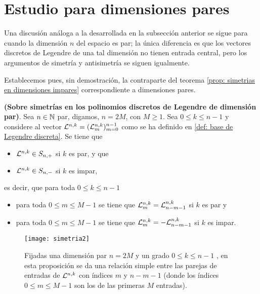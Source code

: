 \QEDB
\vspace{0.2cm}

\section{Estudio para dimensiones pares}
Una discusión análoga a la desarrollada en la subsección
anterior se sigue para cuando la dimensión $n$ del espacio
es par; la única diferencia es que los vectores discretos
de Legendre de una tal dimensión no tienen entrada central,
pero los argumentos de simetría y antisimetría se siguen
igualmente.

Establecemos pues, sin demostración, 
la contraparte del teorema
\ref{prop: simetrias en dimensiones impares} 
correspondiente a dimensiones pares.


\begin{teo}
\label{prop: simetrias en dimensiones pares}
\textbf{(Sobre simetrías
en los polinomios discretos de Legendre de dimensión par)}.
Sea $n \in \mathbb{N}$ par, digamos,
$n=2M$, con $M \geq 1$. Sea $0 \leq k \leq n-1$ y
considere al vector $\mathcal{L}^{n,k}=(\mathcal{L}^{n,k}_{m})_{m=0}^{n-1}$
como se ha definido en \ref{def: base de Legendre discreta}.
Se tiene que 
\begin{itemize}
\item $\mathcal{L}^{n,k} \in S_{n,+}$ si $k$ es par, y que
\item $\mathcal{L}^{n,k} \in S_{n,-}$ si $k$ es impar,
\end{itemize}
es decir, que para toda $0 \leq k \leq n-1$ 

\begin{itemize}
\item para toda $0 \leq m \leq M-1$ se tiene que 
$\mathcal{L}^{n,k}_{m} = \mathcal{L}^{n,k}_{n-m-1}$ si $k$ es par y
\item para toda $0 \leq m \leq M-1$ 
se tiene que $\mathcal{L}^{n,k}_{m} = -\mathcal{L}^{n,k}_{n-m-1}$ si $k$ es impar.
\end{itemize}

\end{teo}
\begin{figure}[H]
\centering\captionsetup{format = hang}
	\begin{measuredfigure}
		\texttt{[image: simetria2]} 
		\caption{Fijadas una dimensión par $n=2M$ 
		y un grado $0 \leq k \leq n-1$ ,
		en esta proposición se da una relación simple entre las parejas 
		de entradas de $\mathcal{L}^{n,k}$ con índices $m$ y $n-m-1$ 
		(donde los índices $0 \leq m \leq M-1$ son los de las primeras
		$M$ entradas).}
 	\end{measuredfigure}
 \end{figure}